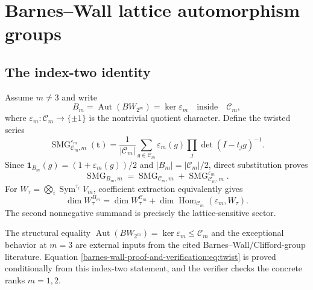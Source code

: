 \documentclass[10pt]{article}
\newcommand{\SMG}{\operatorname{SMG}}
\newcommand{\MGF}{\SMG}
\begin{document}
\clearpage
\section{Barnes--Wall lattice automorphism groups}\label{proof:barnes-wall}
\begingroup
{}
\providecommand{\MGF}{\SMG}
\renewcommand{\MGF}{\SMG}
\setcounter{theorem}{0}
\setcounter{proposition}{0}
\setcounter{lemma}{0}
\setcounter{corollary}{0}
\setcounter{remark}{0}
\begin{abstract}
Away from the exceptional rank $m=3$, the Barnes--Wall automorphism group is
an index-two subgroup of the real Clifford group.  We prove the resulting
twisted sigma--MGF identity and verify it exhaustively in the concrete models
$BW_2=\mathbb Z^2$ and $BW_4=D_4$.  The constructed groups have orders $8$
and $1152$ and agree exactly with the Clifford matrices preserving the
specified lattice bases.  All 16 coefficient comparisons pass.
\end{abstract}

\subsection{The index-two identity}
Assume $m\ne3$ and write
\[
B_m=\operatorname{Aut}(BW_{2^m})=\ker\varepsilon_m
\quad\text{inside}\quad \mathcal C_m,
\]
where $\varepsilon_m:\mathcal C_m\to\{\pm1\}$ is the nontrivial quotient
character.  Define the twisted series
\[
\MGF^{\varepsilon_m}_{\mathcal C_m,m}(\mathbf t)
=\frac1{|\mathcal C_m|}\sum_{g\in\mathcal C_m}\varepsilon_m(g)
\prod_j\det(I-t_jg)^{-1}.
\]
Since $\mathbf1_{B_m}(g)=(1+\varepsilon_m(g))/2$ and
$|B_m|=|\mathcal C_m|/2$, direct substitution proves
\begin{equation}\label{barnes-wall-proof-and-verification:eq:twist}
\boxed{\MGF_{B_m,m}=\MGF_{\mathcal C_m,m}
+\MGF^{\varepsilon_m}_{\mathcal C_m,m}.}
\end{equation}
For $W_\tau=\bigotimes_i\operatorname{Sym}^{\tau_i}V_m$, coefficient
extraction equivalently gives
\[
\dim W_\tau^{B_m}=\dim W_\tau^{\mathcal C_m}
+\dim\operatorname{Hom}_{\mathcal C_m}(\varepsilon_m,W_\tau).
\]
The second nonnegative summand is precisely the lattice-sensitive sector.

The structural equality
$\operatorname{Aut}(BW_{2^m})=\ker\varepsilon_m\leq\mathcal C_m$ and the
exceptional behavior at $m=3$ are external inputs from the cited
Barnes--Wall/Clifford-group literature.  Equation \eqref{barnes-wall-proof-and-verification:eq:twist} is proved
conditionally from this index-two statement, and the verifier checks the
concrete ranks $m=1,2$.
\end{document}
